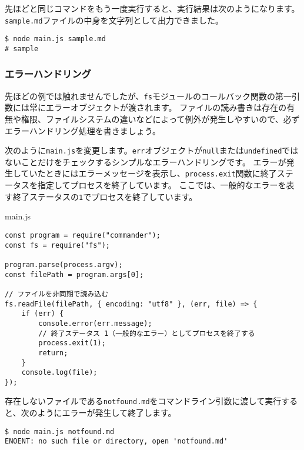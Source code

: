 先ほどと同じコマンドをもう一度実行すると、実行結果は次のようになります。
\texttt{sample.md}ファイルの中身を文字列として出力できました。

\begin{lstlisting}
$ node main.js sample.md
# sample
\end{lstlisting}

\hypertarget{error-handling}{%
\subsubsection{エラーハンドリング}\label{error-handling}}

先ほどの例では触れませんでしたが、\texttt{fs}モジュールのコールバック関数の第一引数には常にエラーオブジェクトが渡されます。
ファイルの読み書きは存在の有無や権限、ファイルシステムの違いなどによって例外が発生しやすいので、必ずエラーハンドリング処理を書きましょう。

次のように\texttt{main.js}を変更します。\texttt{err}オブジェクトが\texttt{null}または\texttt{undefined}ではないことだけをチェックするシンプルなエラーハンドリングです。
エラーが発生していたときにはエラーメッセージを表示し、\texttt{process.exit}関数に終了ステータスを指定してプロセスを終了しています。
ここでは、一般的なエラーを表す終了ステータスの\texttt{1}でプロセスを終了しています。

\begin{listtitle}
main.js
\end{listtitle}
\begin{lstlisting}
const program = require("commander");
const fs = require("fs");

program.parse(process.argv);
const filePath = program.args[0];

// ファイルを非同期で読み込む
fs.readFile(filePath, { encoding: "utf8" }, (err, file) => {
    if (err) {
        console.error(err.message);
        // 終了ステータス 1（一般的なエラー）としてプロセスを終了する
        process.exit(1);
        return;
    }
    console.log(file);
});
\end{lstlisting}
\listend

存在しないファイルである\texttt{notfound.md}をコマンドライン引数に渡して実行すると、次のようにエラーが発生して終了します。

\begin{lstlisting}
$ node main.js notfound.md
ENOENT: no such file or directory, open 'notfound.md'
\end{lstlisting}

